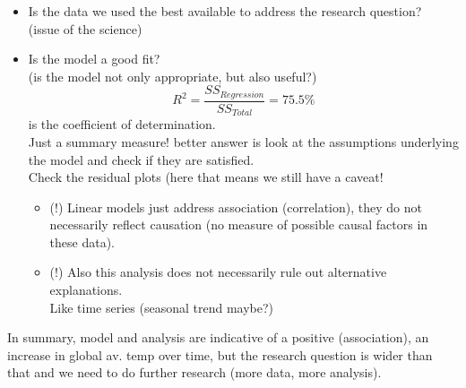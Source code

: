 \documentclass[a4paper, 11pt, twoside]{article}
\begin{document}
\begin{itemize}
	\item Is the data we used the best available to address the research question?\\ 
		(issue of the science)
	\item Is the model a good fit?\\
		(is the model not only appropriate, but also useful?)\\
		\[R^2 = \frac{SS_{Regression}}{SS_{Total}}=75.5\%\] is the coefficient of determination.\\
		Just a summary measure! better answer is look at the assumptions underlying the model and check if they are satisfied. \\
		Check the residual plots (here that means we still have a caveat!
		\begin{itemize}
			\item (!) Linear models just address association (correlation), they do not necessarily reflect causation (no measure of possible causal factors in these data).
			\item (!) Also this analysis does not necessarily rule out alternative explanations.\\
				Like time series (seasonal trend maybe?)
		\end{itemize}
\end{itemize}

In summary, model and analysis are indicative of a positive (association), an increase in global av. temp over time, but the research question is wider than that and we need to do further research (more data, more analysis).
\end{document}
